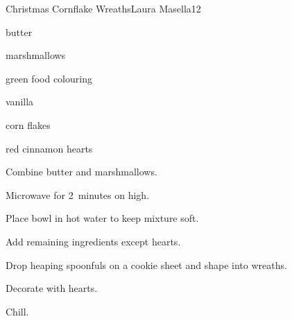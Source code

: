 \begin{recipe}{Christmas Cornflake Wreaths}{Laura Masella}{12}

\begin{ingredients}
\item \C{\half} butter
\item {} marshmallows
\item {} green food colouring
\item {} vanilla
\item {} corn flakes
\item red cinnamon hearts
\end{ingredients}

\begin{directions}
\item Combine butter and marshmallows.
\item Microwave for 2~minutes on high.
\item Place bowl in hot water to keep mixture soft.
\item Add remaining ingredients except hearts.
\item Drop heaping spoonfuls on a cookie sheet and shape into wreaths.
\item Decorate with hearts.
\item Chill.
\end{directions}

\end{recipe}
